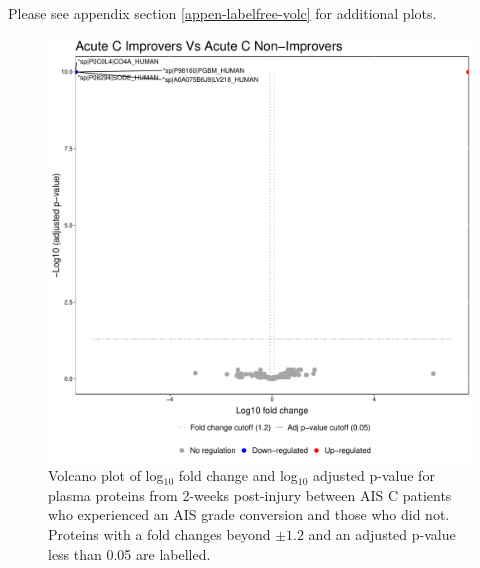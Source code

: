 \documentclass[
]{article}
\begin{document}
Please see appendix section \ref{appen-labelfree-volc} for additional plots.

\clearpage



\begin{figure}
\includegraphics[width=1\linewidth]{figures/openms_protein_quantification/label_free/openms_volcano_plot_2021-08-10_0008} \caption{Volcano plot of log\(_10\) fold change and log\(_10\) adjusted p-value for plasma proteins from 2-weeks post-injury between AIS C patients who experienced an AIS grade conversion and those who did not. Proteins with a fold changes beyond \(\pm 1.2\) and an adjusted p-value less than 0.05 are labelled.}\label{fig:volc-plot-c-imp-vs-nonimp}
\end{figure}
\end{document}
